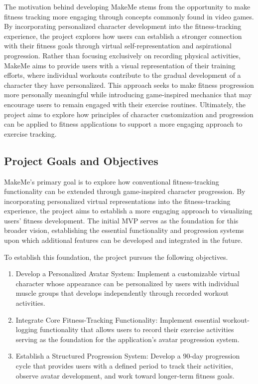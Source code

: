\documentclass[11pt]{article}
\begin{document}
The motivation behind developing MakeMe stems from the opportunity to make fitness
tracking more engaging through concepts commonly found in video games.
By incorporating personalized character development into the fitness-tracking
experience, the project explores how users can establish a stronger connection
with their fitness goals through virtual self-representation and aspirational
progression. Rather than focusing exclusively on recording physical activities,
MakeMe aims to provide users with a visual representation of their training efforts,
where individual workouts contribute to the gradual development of a character
they have personalized. This approach seeks to make fitness progression more
personally meaningful while introducing game-inspired mechanics that may
encourage users to remain engaged with their exercise routines. Ultimately,
the project aims to explore how principles of character customization and progression
can be applied to fitness applications to support a more engaging approach to exercise tracking.
\subsection{Project Goals and Objectives}
MakeMe's primary goal is to explore how conventional fitness-tracking functionality
can be extended through game-inspired character progression. By incorporating personalized
virtual representations into the fitness-tracking experience, the project aims to establish
a more engaging approach to visualizing users' fitness development. The initial MVP serves
as the foundation for this broader vision, establishing the essential functionality and
progression systems upon which additional features can be developed and integrated in the future.

To establish this foundation, the project pursues the following objectives.
\begin{enumerate}
    \item Develop a Personalized Avatar System: Implement a customizable virtual
    character whose appearance can be personalized by users with individual muscle groups
    that develops independently through recorded workout activities.
    
    \item Integrate Core Fitness-Tracking Functionality: Implement essential
    workout-logging functionality that allows users to record their exercise
    activities serving as the foundation for the application's avatar progression system.

    \item Establish a Structured Progression System: Develop a 90-day progression
    cycle that provides users with a defined period to track their activities, observe
    avatar development, and work toward longer-term fitness goals.

\end{enumerate}
\end{document}
